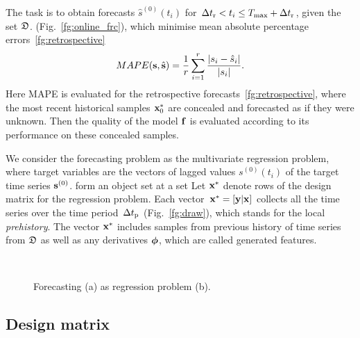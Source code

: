 \documentclass[conference]{IEEEtran}
\begin{document}
 The task is to obtain forecasts $\hat{s}^{(0)}(t_i)$ for  $\Delta t_\text{r} <  t_i \leq T_{\max} + \Delta t_\text{r}$, given the set  ${\mathfrak{D}}$. (Fig.~\ref{fg:online_frc}), which minimise mean absolute percentage errors~\ref{fg:retrospective}
 \[ MAPE({\mathbf{s}}, \hat{{\mathbf{s}}}) = \frac{1}{r}\sum_{i = 1}^{r} \frac{|s_i - \hat{s}_i|}{|s_i|}. \]
Here MAPE is evaluated for the retrospective forecasts~\ref{fg:retrospective}, where the most recent historical samples ${\mathbf{x}}_0^{*}$ are concealed and forecasted as if they were unknown. Then the quality of the model ${\mathbf{f}}$ is evaluated according to its performance on these concealed samples.


 We consider the forecasting problem as the multivariate regression problem, where target variables are the vectors of lagged values $s^{(0)}(t_i)$ of the target time series ${\mathbf{s}}^{(0)}$. form an object set at a set Let ${\mathbf{x}}^{*}$ denote rows of the design matrix for the regression problem. Each vector~${\mathbf{x}}^{*} = [{\mathbf{y}}| {\mathbf{x}}]$ collects all the time series over the time period~$\Delta t_\text{p}$ (Fig.~\ref{fg:draw}), which stands for the local \emph{prehistory}. The vector ${\mathbf{x}}^{*}$ includes samples from previous history of time series from ${\mathfrak{D}}$ as well as any derivatives ${\boldsymbol{\phi}}$, which are called generated features.



\begin{figure}[!ht]
\centering
{} \\
\centering {}
\caption{Forecasting (a) as regression problem (b).}
\end{figure}

\subsection{Design matrix}
\end{document}
